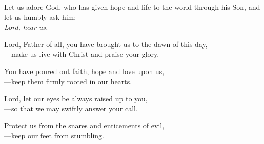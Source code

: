 \intercessions

\begin{raggedright}
Let us adore God, who has given hope and life to the world through his Son, and let us humbly ask him:\\
\emph{Lord, hear us.}

\medskip
Lord, Father of all, you have brought us to the dawn of this day,\\
{\color{red}---}make us live with Christ and praise your glory.

\medskip
You have poured out faith, hope and love upon us,\\
{\color{red}---}keep them firmly rooted in our hearts.

\medskip
Lord, let our eyes be always raised up to you,\\
{\color{red}---}so that we may swiftly answer your call.

\medskip
Protect us from the snares and enticements of evil,\\
{\color{red}---}keep our feet from stumbling.
\end{raggedright}